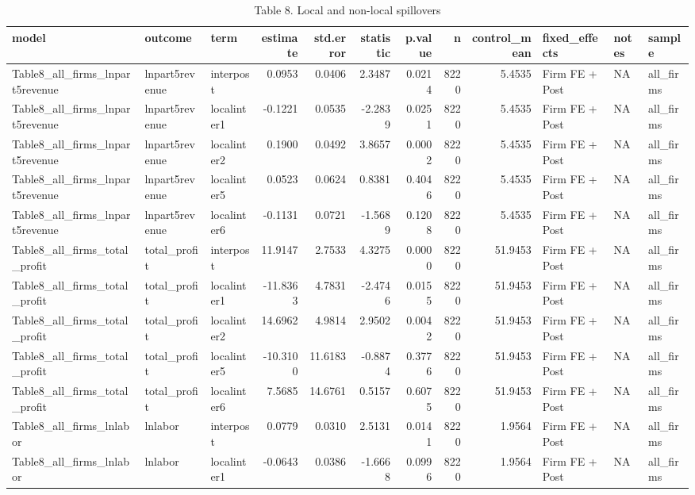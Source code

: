 \begin{table}

\caption{Table 8. Local and non-local spillovers}
\centering
\begin{tabular}[t]{lllrrrrrrlll}
\toprule
model & outcome & term & estimate & std.error & statistic & p.value & n & control\_mean & fixed\_effects & notes & sample\\
\midrule
Table8\_all\_firms\_lnpart5revenue & lnpart5revenue & interpost & 0.0953 & 0.0406 & 2.3487 & 0.0214 & 8220 & 5.4535 & Firm FE + Post & NA & all\_firms\\
Table8\_all\_firms\_lnpart5revenue & lnpart5revenue & localinter1 & -0.1221 & 0.0535 & -2.2839 & 0.0251 & 8220 & 5.4535 & Firm FE + Post & NA & all\_firms\\
Table8\_all\_firms\_lnpart5revenue & lnpart5revenue & localinter2 & 0.1900 & 0.0492 & 3.8657 & 0.0002 & 8220 & 5.4535 & Firm FE + Post & NA & all\_firms\\
Table8\_all\_firms\_lnpart5revenue & lnpart5revenue & localinter5 & 0.0523 & 0.0624 & 0.8381 & 0.4046 & 8220 & 5.4535 & Firm FE + Post & NA & all\_firms\\
Table8\_all\_firms\_lnpart5revenue & lnpart5revenue & localinter6 & -0.1131 & 0.0721 & -1.5689 & 0.1208 & 8220 & 5.4535 & Firm FE + Post & NA & all\_firms\\
\addlinespace
Table8\_all\_firms\_total\_profit & total\_profit & interpost & 11.9147 & 2.7533 & 4.3275 & 0.0000 & 8220 & 51.9453 & Firm FE + Post & NA & all\_firms\\
Table8\_all\_firms\_total\_profit & total\_profit & localinter1 & -11.8363 & 4.7831 & -2.4746 & 0.0155 & 8220 & 51.9453 & Firm FE + Post & NA & all\_firms\\
Table8\_all\_firms\_total\_profit & total\_profit & localinter2 & 14.6962 & 4.9814 & 2.9502 & 0.0042 & 8220 & 51.9453 & Firm FE + Post & NA & all\_firms\\
Table8\_all\_firms\_total\_profit & total\_profit & localinter5 & -10.3100 & 11.6183 & -0.8874 & 0.3776 & 8220 & 51.9453 & Firm FE + Post & NA & all\_firms\\
Table8\_all\_firms\_total\_profit & total\_profit & localinter6 & 7.5685 & 14.6761 & 0.5157 & 0.6075 & 8220 & 51.9453 & Firm FE + Post & NA & all\_firms\\
\addlinespace
Table8\_all\_firms\_lnlabor & lnlabor & interpost & 0.0779 & 0.0310 & 2.5131 & 0.0141 & 8220 & 1.9564 & Firm FE + Post & NA & all\_firms\\
Table8\_all\_firms\_lnlabor & lnlabor & localinter1 & -0.0643 & 0.0386 & -1.6668 & 0.0996 & 8220 & 1.9564 & Firm FE + Post & NA & all\_firms\\

\end{tabular}
\end{table}
